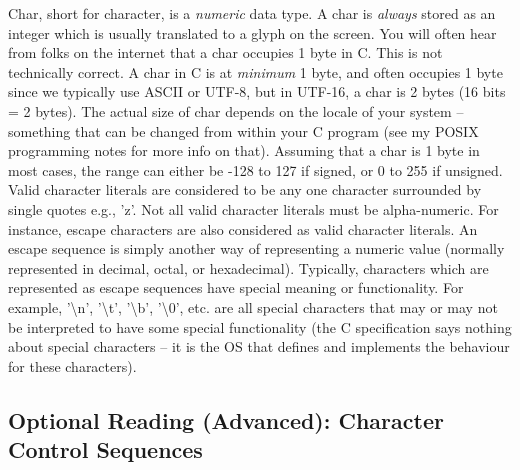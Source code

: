 \documentclass{article}
\begin{document}
Char, short for character, is a \textit{numeric} data type. A char is \textit{always} stored as an integer
which is usually translated to a glyph on the screen. You will often hear from folks on the internet that a
char occupies 1 byte in C. This is not technically correct. A char in C is at \textit{minimum} 1 byte, and
often occupies 1 byte since we typically use ASCII or UTF-8, but in UTF-16, a char is 2 bytes (16 bits = 2
bytes). The actual size of char depends on the locale of your system – something that can be changed from
within your C program (see my POSIX programming notes for more info on that). Assuming that a char is 1 byte
in most cases, the range can either be -128 to 127 if signed, or 0 to 255 if unsigned. Valid character
literals are considered to be any one character surrounded by single quotes e.g., 'z'. Not all valid character
literals must be alpha-numeric. For instance, escape characters are also considered as valid character
literals. An escape sequence is simply another way of representing a numeric value (normally represented in
decimal, octal, or hexadecimal). Typically, characters which are represented as escape sequences have special
meaning or functionality. For example, '\textbackslash{}n', '\textbackslash{}t', '\textbackslash{}b',
'\textbackslash{}0', etc. are all special characters that may or may not be interpreted to have some special
functionality (the C specification says nothing about special characters – it is the OS that defines and
implements the behaviour for these characters).

\subsection{Optional Reading (Advanced): Character Control Sequences}
\end{document}
